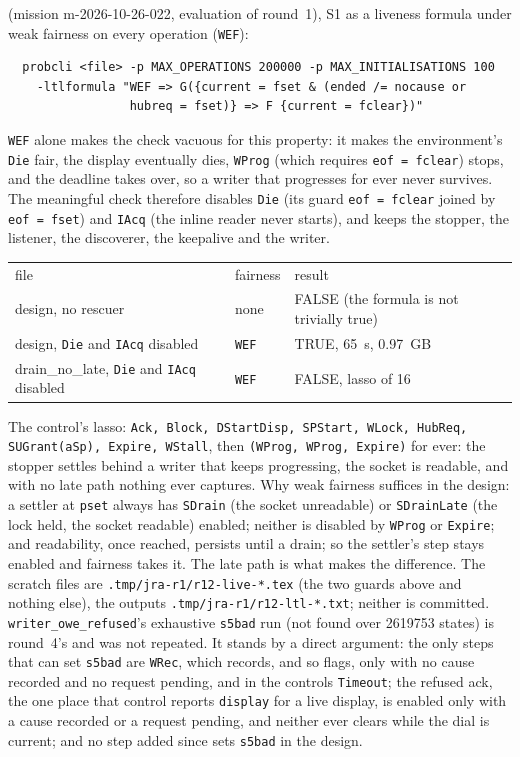 \documentclass[a4paper,10pt,fleqn]{article}
\begin{document}
(mission m-2026-10-26-022, evaluation of round~1), S1 as a liveness formula
under weak fairness on every operation (\texttt{WEF}):
\begin{verbatim}
  probcli <file> -p MAX_OPERATIONS 200000 -p MAX_INITIALISATIONS 100
    -ltlformula "WEF => G({current = fset & (ended /= nocause or
                 hubreq = fset)} => F {current = fclear})"
\end{verbatim}
\texttt{WEF} alone makes the check vacuous for this property: it makes the
environment's \texttt{Die} fair, the display eventually dies, \texttt{WProg}
(which requires \texttt{eof = fclear}) stops, and the deadline takes over, so a
writer that progresses for ever never survives.  The meaningful check therefore
disables \texttt{Die} (its guard \texttt{eof = fclear} joined by
\texttt{eof = fset}) and \texttt{IAcq} (the inline reader never starts), and
keeps the stopper, the listener, the discoverer, the keepalive and the writer.
\begin{center}
\begin{tabular}{lll}
file & fairness & result \\
design, no rescuer & none & FALSE (the formula is not trivially true) \\
design, \texttt{Die} and \texttt{IAcq} disabled & \texttt{WEF} & TRUE, 65~s, 0.97~GB \\
drain\_no\_late, \texttt{Die} and \texttt{IAcq} disabled & \texttt{WEF} & FALSE, lasso of 16 \\
\end{tabular}
\end{center}
The control's lasso: \texttt{Ack, Block, DStartDisp, SPStart, WLock, HubReq,
SUGrant(aSp), Expire, WStall}, then \texttt{(WProg, WProg, Expire)} for ever:
the stopper settles behind a writer that keeps progressing, the socket is
readable, and with no late path nothing ever captures.  Why weak fairness
suffices in the design: a settler at \texttt{pset} always has \texttt{SDrain}
(the socket unreadable) or \texttt{SDrainLate} (the lock held, the socket
readable) enabled; neither is disabled by \texttt{WProg} or \texttt{Expire}; and
readability, once reached, persists until a drain; so the settler's step stays
enabled and fairness takes it.  The late path is what makes the difference.  The
scratch files are \texttt{.tmp/jra-r1/r12-live-*.tex} (the two guards above and
nothing else), the outputs \texttt{.tmp/jra-r1/r12-ltl-*.txt}; neither is
committed.  \texttt{writer\_owe\_refused}'s exhaustive \texttt{s5bad} run (not found
over 2619753 states) is round~4's and was not repeated.  It stands by a direct
argument: the only steps that can set \texttt{s5bad} are \texttt{WRec}, which
records, and so flags, only with no cause recorded and no request pending, and
in the controls \texttt{Timeout}; the refused ack, the one place that control
reports \texttt{display} for a live display, is enabled only with a cause
recorded or a request pending, and neither ever clears while the dial is
current; and no step added since sets \texttt{s5bad} in the design.
\end{document}

